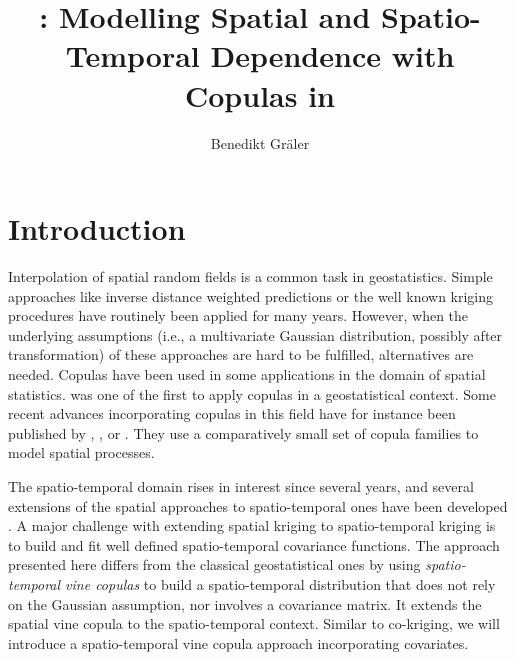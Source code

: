 \documentclass[article,nojss]{jss}
\author{Benedikt Gr\"{a}ler}
\title{\pkg{spcopula}: Modelling Spatial and Spatio-Temporal Dependence with Copulas in \proglang{R}}
\begin{document}

\maketitle


\section{Introduction}
\label{sec:introduction}

Interpolation of spatial random fields is a common task in geostatistics. Simple approaches like inverse distance weighted predictions or the well known kriging procedures have routinely been applied for many years. However, when the underlying assumptions (i.e., a multivariate Gaussian distribution, possibly after transformation) of these approaches are hard to be fulfilled, alternatives are needed. Copulas have been used in some applications in the domain of spatial statistics. \citet{Bardossy2006} was one of the first to apply copulas in a geostatistical context. Some recent advances incorporating copulas in this field have for instance been published by \citet{Kazianka2011,Kazianka2010}, \citet{Bardossy2011}, \citet{Bardossy2009} or \citet{Bardossy2008}. They use a comparatively small set of copula families to model spatial processes. 

The spatio-temporal domain rises in interest since several years, and several extensions of the spatial approaches to spatio-temporal ones have been developed \citep[see e.g., ][]{Cressie2011}. A major challenge with extending spatial kriging to spatio-temporal kriging is to build and fit well defined spatio-temporal covariance functions. The approach presented here differs from the classical geostatistical ones by using \emph{spatio-temporal vine copulas} to build a spatio-temporal distribution that does not rely on the Gaussian assumption, nor involves a covariance matrix. It extends the spatial vine copula \citep{Graler2014} to the spatio-temporal context. Similar to co-kriging, we will introduce a spatio-temporal vine copula approach incorporating covariates.
\end{document}

